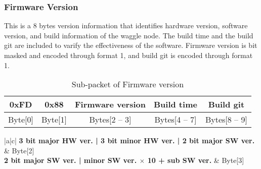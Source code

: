 \subsubsection{Firmware Version}
This is a 8 bytes version information that identifies hardware version, software version, and build information of the waggle node.
The build time and the build git are included to varify the effectiveness of the software.
Firmware version is bit masked and encoded through format 1, and build git is encoded through format 1.

\begin{table}[h!]
    \centering
    \caption{Sub-packet of Firmware version}
    \begin{tabular}{|c|c|c|c|c|}
        \hline
        \rowcolor{black!8}
        \textbf{0xFD} & \textbf{0x88} & \textbf{Firmware version} & \textbf{Build time} & \textbf{Build git} \\ \hline
        Byte[0] & Byte[1] & Bytes[2 -- 3] & Bytes[4 -- 7] & Bytes[8 -- 9]\\ \hline
    \end{tabular}
\end{table}


\begin{table}[h!]
    \centering
    \caption{Firmware version}
    \begin{tabular}{|a|c|}
        \hline
        \textbf{3 bit major HW ver. | 3 bit minor HW ver. | 2 bit major SW ver.} & Byte[2] \\ \hline
        \textbf{2 bit major SW ver. | minor SW ver. $\times$ 10 + sub SW ver.} & Byte[3]\\ \hline
    \end{tabular}
\end{table}

